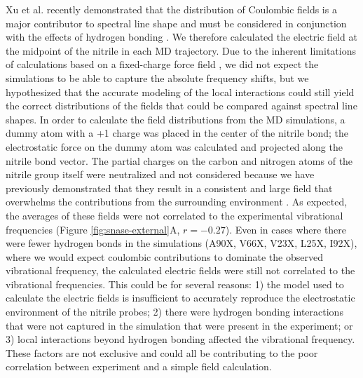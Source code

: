 Xu et al. recently demonstrated that the distribution of Coulombic fields is a major contributor to spectral line shape and must be considered in conjunction with the effects of hydrogen bonding \cite{Xu2018}. 
We therefore calculated the electric field at the midpoint of the nitrile in each MD trajectory. 
Due to the inherent limitations of calculations based on a fixed-charge force field \cite{Slocum2017, Ritchie2013, Ricthie2014, Ensign2011}, we did not expect the simulations to be able to capture the absolute frequency shifts, but we hypothesized that the  accurate modeling of the local interactions could still yield the correct distributions of the fields that could be compared against spectral line shapes. 
In order to calculate the field distributions from the MD simulations, a dummy atom with a +1 charge was placed in the center of the nitrile bond; 
the electrostatic force on the dummy atom was calculated and projected along the nitrile bond vector. 
The partial charges on the carbon and nitrogen atoms of the nitrile group itself were neutralized and not considered because we have previously demonstrated that they result in a consistent and large field that overwhelms the contributions from the surrounding environment \cite{Stafford2010, Ritchie2013}. 
As expected, the averages of these fields were not correlated to the experimental vibrational frequencies (Figure \ref{fig:snase-external}A, $r = -0.27$). 
Even in cases where there were fewer hydrogen bonds in the simulations (A90X, V66X, V23X, L25X, I92X), where we would expect coulombic contributions to dominate the observed vibrational frequency, the calculated electric fields were still not correlated to the vibrational frequencies. 
This could be for several reasons: 
1) the model used to calculate the electric fields is insufficient to accurately reproduce the electrostatic environment of the nitrile probes; 
2) there were hydrogen bonding interactions that were not captured in the simulation that were present in the experiment; or 
3) local interactions beyond hydrogen bonding affected the vibrational frequency. 
These factors are not exclusive and could all be contributing to the poor correlation between experiment and a simple field calculation.


